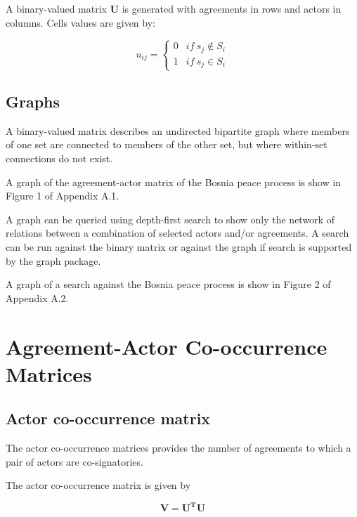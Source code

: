 \documentclass{article}
\begin{document}
A binary-valued matrix $\bm{U}$ is generated with agreements in rows and actors in columns. Cells values are given by:

\begin{equation}
u_{ij} =
\begin{cases}
0& if \ s_j \notin S_{i}\\
1 & if \ s_j \in S_{i}
\end{cases}
\end{equation}


\subsection{Graphs}

A binary-valued matrix describes an undirected bipartite graph where members of one set are connected to members of the other set, but where within-set connections do not exist. \newline

A graph of the agreement-actor matrix of the Bosnia peace process is show in Figure 1 of Appendix A.1.\newline

A graph can be queried using depth-first search to show only the network of relations between a combination of selected actors and/or agreements. A search can be run against the binary matrix or against the graph if search is supported by the graph package. \newline

A graph of a search against the Bosnia peace process is show in Figure 2 of Appendix A.2.\newline

\section{Agreement-Actor Co-occurrence Matrices}

\subsection{Actor co-occurrence matrix}

The actor co-occurrence matrices provides the number of agreements to which a pair of actors are co-signatories.\newline

The actor co-occurrence matrix is given by

\begin{equation}
\bm{V = U^TU}
\end{equation}
\end{document}
